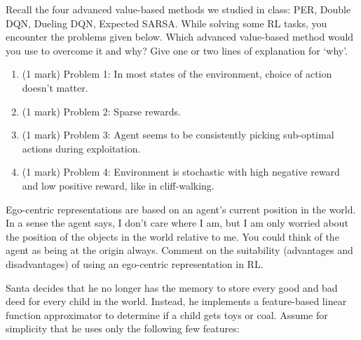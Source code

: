 \documentclass[addpoints,12pt,solution]{exam}
\begin{document}
\begin{questions}

\question[4] Recall the four advanced value-based methods we studied in class: PER, Double DQN, Dueling DQN, Expected SARSA.
While solving some RL tasks, you encounter the problems given below. Which advanced value-based method would you use to overcome it and why? Give one or two lines of explanation for `why’.
\begin{enumerate}[label=(\alph*)]
    \item (1 mark) Problem 1: In most states of the environment, choice of action doesn’t matter.
    \begin{solution}

\end{solution}
    \item (1 mark) Problem 2: Sparse rewards.
    \begin{solution}

\end{solution}
    \item (1 mark) Problem 3: Agent seems to be consistently picking sub-optimal actions during exploitation.
    \begin{solution}

\end{solution}
    \item (1 mark) Problem 4: Environment is stochastic with high negative reward and low positive reward, like in cliff-walking.
\begin{solution}

\end{solution}
\end{enumerate}


\question[4] Ego-centric representations are based on an agent’s current position in the world. In a sense the agent says, I don’t care where I am, but I am only worried about the position of the objects in the world relative to me. You could think of the agent as being at the origin always. Comment on the suitability (advantages and disadvantages) of using an ego-centric representation in RL.

\begin{solution}

\end{solution}

\question[12]
Santa decides that he no longer has the memory to store every good and bad deed for every child in the world. Instead, he implements a feature-based linear function approximator to determine if a child gets toys or coal. Assume for simplicity that he uses only the following few features:


\end{questions}
\end{document}
